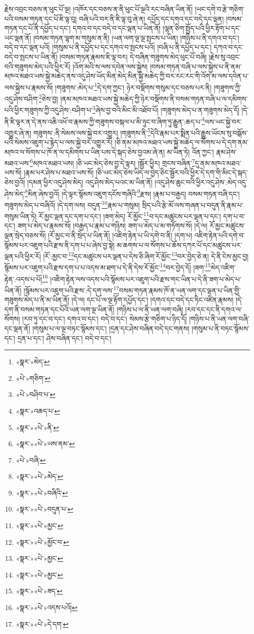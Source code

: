 རྗེས་འབྲང་བཅས་ན་ཕུང་པོ་ལྔ། །འཁོར་དང་བཅས་ན་ནི་ཕུང་པོ་ལྔའི་རང་བཞིན་ཡིན་ནོ། །ཡང་དགེ་བ་རྩེ་གཅིག་པའི་བསམ་གཏན་དང་པོ་ཇི་ལྟ་བུ། བཞི་པའི་བར་ནི་ཇི་ལྟ་བུ་ཞེ་ན། དཔྱོད་དང་དགའ་དང་བདེ་དང་ལྡན། །བསམ་གཏན་དང་པོ་ནི་དཔྱོད་པ་དང་། དགའ་བ་དང་བདེ་བ་དང་ལྡན་པ་ཡིན་ནོ། །ལྷན་ཅིག་སྤྱོད་པའི་ཕྱིར་རྟོག་པ་དང་ཡང་ལྡན་ནོ། །བསམ་གཏན་ལྷག་མ་གསུམ་ན་ནི། །ཡན་ལག་ལྔ་ལྔ་སྤངས་པ་ཡིན། །གཉིས་པ་ནི་དགའ་བ་དང་། བདེ་བ་དང་ལྡན་པའོ། །གསུམ་པ་ནི་དཔྱོད་པ་དང་དགའ་བ་སྤངས་པའོ། །བཞི་པ་ནི་དཔྱོད་པ་དང་། དཀའ་བ་དང་བདེ་བ་སྤངས་པ་ཡིན་ནོ། །བསམ་གཏན་རྣམས་ཇི་ལྟ་བར། དེ་བཞིན་གཟུགས་མེད་ཕུང་པོ་བཞི། །རྗེས་སུ་འབྲང་བའི་གཟུགས་མེད་པའི་ཕྱིར་རོ། །འོག་མའི་ས་ལས་དབེན་ལས་སྐྱེས། །བསམ་གཏན་བཞི་པ་ལས་སྐྱེས་པ་ནི་ནམ་མཁའ་མཐའ་ཡས་སྐྱེ་མཆེད་ནས་འདུ་ཤེས་ཡོད་མིན་མེད་མིན་སྐྱེ་མཆེད་ཀྱི་བར་རང་རང་གི་འོག་མ་ལས་དབེན་པ་ལས་སྐྱེས་པ་རྣམས་སོ། །གཟུགས་:མེད་པ་\footnote{«སྣར་»མེད་}དེ་དག་ཀྱང་། ཉེར་བསྡོགས་གསུམ་དང་བཅས་པར་ནི། །གཟུགས་ཀྱི་འདུ་ཤེས་བཤིག་\footnote{«པེ་»གཅིག་}ཅེས་བྱ། །ནམ་མཁའ་མཐའ་ཡས་སྐྱེ་མཆེད་ཀྱི་ཉེར་བསྡོགས་ནི་བསམ་གཏན་བཞི་པ་ལ་དམིགས་པའི་ཕྱིར་གཟུགས་ཀྱི་འདུ་ཤེས་:བཤིག་པ་\footnote{«པེ་»བཤིབ་པ་}ཞེས་བྱ་བའི་མིང་མི་འཐོབ་པོ། །གཟུགས་མེད་པ་ན་གཟུགས་མེད་དོ། །དེ་ནི་ཇི་ལྟར་ན་དེ་ནས་འཆི་འཕོ་བ་རྣམས་ཀྱི་གཟུགས་བསྐལ་པ་མི་ཉུང་བ་ཞིག་ཏུ་རྒྱུན་:ཆད་པ་\footnote{«སྣར་»འཆད་པ་}ལས་ཡང་སྐྱེ་བར་འགྱུར་ཞེ་ན། གཟུགས་:ནི་སེམས་ལས་སྐྱེ་བར་འགྱུར། །གཟུགས་ནི་\footnote{«སྣར་»«པེ་»ནི་}དེའི་རྣམ་པར་སྨིན་པའི་རྒྱུས་ཡོངས་སུ་བསྒོས་པའི་སེམས་འཇུག་པ་རྙེད་པ་ལས་སྐྱེ་བར་འགྱུར་རོ། །ཅི་ནམ་མཁའ་མཐའ་ཡས་སྐྱེ་མཆེད་ལ་སོགས་པ་དེ་དག་ནམ་མཁའ་ལ་སོགས་པ་ཁོ་ན་ལ་དམིགས་པ་ཡིན་པས་དེ་སྐད་ཅེས་བྱའམ་ཞེ་ན། མ་ཡིན་ཏེ། འོན་ཀྱང་། རྣམ་ཤེས་མཐའ་ཡས་\footnote{«སྣར་»«པེ་»ཡས་ནམ་}མཁའ་མཐའ་ཡས། །ཅི་ཡང་མེད་ཅེས་བྱ་དེ་ལྟར། །སྦྱོར་ཕྱིར། གྲངས་བཞིན་\footnote{«པེ་»བཞི་}དུ་ནམ་མཁའ་མཐའ་ཡས་སོ། །རྣམ་པར་ཤེས་པ་མཐའ་ཡས་སོ། །ཅི་ཡང་མེད་ཅེས་ཡིད་ལ་བྱེད་ཅིང་སྦྱོར་བའི་ཕྱིར་དེ་དག་གི་མིང་དེ་སྐད་ཅེས་བྱའོ། །དམན་ཕྱིར་འདུ་ཤེས་མེད། འདུ་ཤེས་མེད་པའང་མ་ཡིན་ནོ། །འདུ་ཤེས་ཆུང་བའི་ཕྱིར་འདུ་ཤེས་:མེད་འདུ་ཤེས་མེད་\footnote{«སྣར་»«པེ་»མེད་}མིན་ཞེས་བྱའོ། །དེ་ལྟར་སྙོམས་འཇུག་དངོས་གཞིའི་\footnote{«སྣར་»«པེ་»བཞིའི་}རྫས། །རྣམ་པ་བརྒྱད། བསམ་གཏན་བཞི་དང་། གཟུགས་མེད་པ་བཞིའོ། །དེ་དག་ལས། བདུན་\footnote{«སྣར་»«པེ་»བདུན་པ་}རྣམ་པ་གསུམ། སྲིད་པའི་རྩེ་མོ་ལས་གཞན་པ་བདུན་ནི་རྣམ་པ་གསུམ་ཡིན་ཏེ། རོ་མྱང་ལྡན་དང་དག་པ་དང་། །ཟག་མེད། རོ་མྱོང་\footnote{«སྣར་»«པེ་»མྱང་}བ་དང་མཚུངས་པར་ལྡན་པ་དང་། དག་པ་བ་དང་། ཟག་པ་མེད་པ་རྣམས་སོ། །བརྒྱད་པ་རྣམ་པ་གཉིས། ཟག་པ་མེད་པ་མ་གཏོགས་སོ། །དེ་ལ། རོ་མྱང་མཚུངས་ལྡན་སྲེད་བཅས་སོ། །རོ་མྱང་བ་ནི་སྲེད་པ་ཡིན་ནོ། །འཇིག་རྟེན་པ་ཡི་དགེ་བ་ནི། །དག་པ། འཇིག་རྟེན་པའི་དགེ་བ་སྙོམས་པར་འཇུག་པའི་རྫས་ནི་དག་པ་པ་ཞེས་བྱ་སྟེ། མ་ཆགས་པ་ལ་སོགས་པ་ཆོས་དཀར་པོ་དང་མཚུངས་པར་ལྡན་པའི་ཕྱིར་རོ། །རོ་:མྱང་བ་\footnote{«སྣར་»«པེ་»མྱོང་བ་}དང་མཚུངས་པར་ལྡན་པ་དེས་ཅི་ཞིག་རོ་མྱོང་\footnote{«སྣར་»«པེ་»མྱང་}བར་བྱེད་ཅེ་ན། དེ་ནི་ངེས་མྱང་བྱ། སྙོམས་པར་འཇུག་པའི་རྫས་དག་པ་པ་འདས་མ་ཐག་པ་དེ་ནི་དེས་རོ་མྱོང་\footnote{«སྣར་»«པེ་»མྱང་}བར་བྱེད་དོ། །ཟག་\footnote{«སྣར་»«པེ་»ཟད་}མེད་འཇིག་རྟེན་:འདས་པ་པོ།\footnote{«སྣར་»«པེ་»འདས་པའོ།} །འཇིག་རྟེན་ལས་འདས་པའི་སྙོམས་པར་འཇུག་པའི་རྫས་གང་ཡིན་པ་དེ་ནི་ཟག་པ་མེད་པ་ཡིན་ནོ། །སྙོམས་པར་འཇུག་པའི་རྫས་:དེ་དག་ལས་\footnote{«སྣར་»«པེ་»དེ་དག་}བསམ་གཏན་རྣམས་ཁོ་ན་ཡན་ལག་དང་ལྡན་པ་ཡིན་གྱི་གཟུགས་མེད་པ་ནི་མ་ཡིན་ནོ། །དེ་ལ། དང་པོ་ལ་ལྔ་རྟོག་དཔྱོད་དང་། །དགའ་དང་བདེ་དང་ཏིང་འཛིན་རྣམས། །དེ་དག་ནི་བསམ་གཏན་དང་པོའི་ཡན་ལག་ལྔ་ཡིན་ནོ། །གཉིས་པ་ལ་ནི་ཡན་ལག་བཞི། །རབ་དང་དང་ནི་དགའ་ལ་སོགས། །རབ་ཏུ་དང་བ་དང་། དགའ་བ་དང་། བདེ་བ་དང་། སེམས་རྩེ་གཅིག་པ་ཉིད་དོ། །གཉིས་པ་ནི་ཡན་ལག་བཞི་དང་ལྡན་ནོ། །གསུམ་པ་ལ་ལྔ་བཏང་སྙོམས་དང་། །དྲན་དང་ཤེས་བཞིན་བདེ་དང་གནས། །གསུམ་པ་ནི་བཏང་སྙོམས་དང་། དྲན་པ་དང་། ཤེས་བཞིན་དང་། བདེ་བ་དང་། 